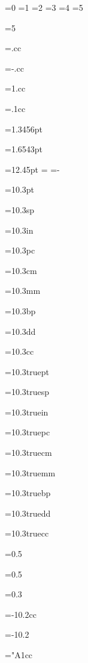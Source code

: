 =0
=1
=2
=3
=4
=5

=5
\showthe{}

=.cc
\showthe{}

=-.cc
\showthe{}

=1.cc
\showthe{}

=.1cc
\showthe{}

=1.3456pt
\showthe{}

=1.6543pt
\showthe{}

=12.45pt
\showthe{}
=
\showthe{}
=-
\showthe{}

=10.3pt
\showthe{}

=10.3sp
\showthe{}

=10.3in
\showthe{}

=10.3pc
\showthe{}

=10.3cm
\showthe{}

=10.3mm
\showthe{}

=10.3bp
\showthe{}

=10.3dd
\showthe{}

=10.3cc
\showthe{}


=10.3truept
\showthe{}

=10.3truesp
\showthe{}

=10.3truein
\showthe{}

=10.3truepc
\showthe{}

=10.3truecm
\showthe{}

=10.3truemm
\showthe{}

=10.3truebp
\showthe{}

=10.3truedd
\showthe{}

=10.3truecc
\showthe{}

=0.5
\showthe{}

=0.5
\showthe{}

=0.3
\showthe{}

=-10.2cc
\showthe{}

=-10.2
\showthe{}

="A1cc
\showthe{}


